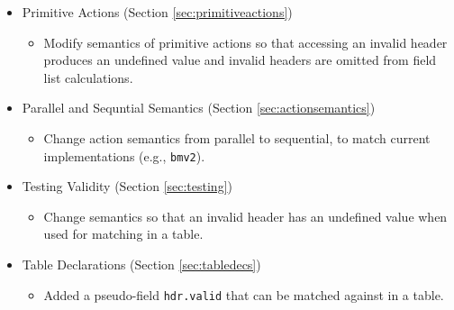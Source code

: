 \documentclass[12pt]{article}
\begin{document}
\begin{itemize}
\item Primitive Actions (Section \ref{sec:primitiveactions})
\begin{itemize}
\item Modify semantics of primitive actions so that accessing an invalid header produces an undefined value and invalid headers are omitted from field list calculations.
\end{itemize}
\item Parallel and Sequntial Semantics (Section \ref{sec:actionsemantics})
\begin{itemize}
\item Change action semantics from parallel to sequential, to match current implementations (e.g., \texttt{bmv2}).
\end{itemize}
\item Testing Validity (Section \ref{sec:testing})
\begin{itemize}
\item Change semantics so that an invalid header has an undefined value when used for matching in a table.
\end{itemize}
\item Table Declarations (Section \ref{sec:tabledecs})
\begin{itemize}
\item Added a pseudo-field \texttt{hdr.valid} that can be matched against in a table.
\end{itemize}
\end{itemize}

\end{document}
